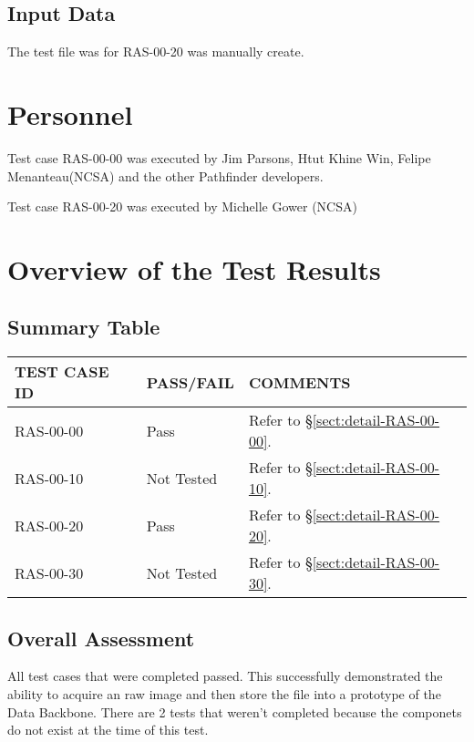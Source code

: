 \documentclass[DM,lsstdraft,STR,toc]{lsstdoc}
\begin{document}
\subsection{Input Data}
\label{sect:inputdata}

The test file was for RAS-00-20 was manually create.

\section{Personnel}
\label{sect:personnel}

Test case RAS-00-00 was executed by Jim Parsons, Htut Khine Win, Felipe Menanteau(NCSA) and the other Pathfinder developers.

Test case RAS-00-20  was executed by Michelle Gower (NCSA)

\newpage

\section{Overview of the Test Results}
\label{sect:overview}

\subsection{Summary Table}
\label{sect:summarytable}

\begin{longtable} {|p{}|p{}|p{}|}\hline
{\bf TEST CASE ID} & {\bf PASS/FAIL} & {\bf COMMENTS} \\\hline
RAS-00-00 & Pass & Refer to \S\ref{sect:detail-RAS-00-00}. \\\hline
RAS-00-10 & Not Tested & Refer to \S\ref{sect:detail-RAS-00-10}. \\\hline
RAS-00-20 & Pass & Refer to \S\ref{sect:detail-RAS-00-20}. \\\hline
RAS-00-30 & Not Tested & Refer to \S\ref{sect:detail-RAS-00-30}. \\\hline
\end{longtable}

\subsection{Overall Assessment}
\label{sect:overallassessment}

All test cases that were completed passed.
This successfully demonstrated the ability to acquire an raw image and then store the file into a prototype of the Data Backbone. There are 2 tests that weren't completed because the componets do not exist at the time of this test.  
\end{document}
